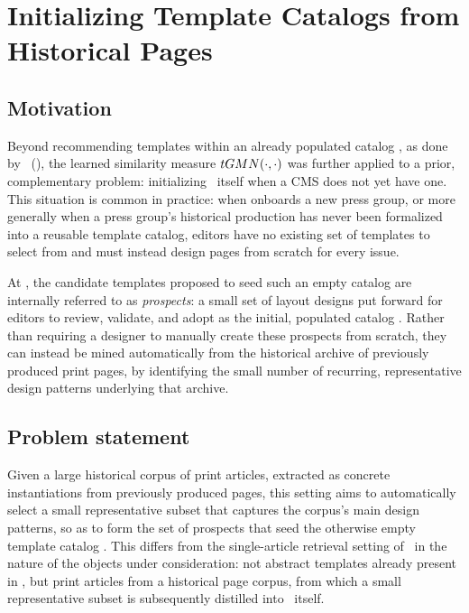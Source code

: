 \chapter{Initializing Template Catalogs from Historical Pages}
\label{chapter:annexe}

\section{Motivation}

Beyond recommending templates within an already populated catalog \templatecatalog, as done by \trs\ (), the learned similarity measure $tGMN(\cdot, \cdot)$ was further applied to a prior, complementary problem: initializing \templatecatalog\ itself when a CMS does not yet have one. This situation is common in practice: when \melody onboards a new press group, or more generally when a press group's historical production has never been formalized into a reusable template catalog, editors have no existing set of templates to select from and must instead design pages from scratch for every issue.

At \melody, the candidate templates proposed to seed such an empty catalog are internally referred to as \emph{prospects}: a small set of layout designs put forward for editors to review, validate, and adopt as the initial, populated catalog \templatecatalog. Rather than requiring a designer to manually create these prospects from scratch, they can instead be mined automatically from the historical archive of previously produced print pages, by identifying the small number of recurring, representative design patterns underlying that archive.

\section{Problem statement}

Given a large historical corpus of print articles, extracted as concrete instantiations from previously produced pages, this setting aims to automatically select a small representative subset that captures the corpus's main design patterns, so as to form the set of prospects that seed the otherwise empty template catalog \templatecatalog. This differs from the single-article retrieval setting of \trs\ in the nature of the objects under consideration: not abstract templates already present in \templatecatalog, but print articles from a historical page corpus, from which a small representative subset is subsequently distilled into \templatecatalog\ itself.

